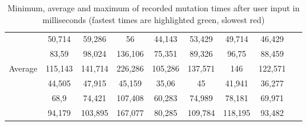 \documentclass[a4paper, 10pt]{article}
\begin{document}
\begin{table}[!ht]
\begin{adjustbox}{angle=90}
{\begin{tabular}{|l|c|c|c|c|c|c|c|r|}
                 \hline
                                                     & 50,714  & 59,286                    & 56                        & 44,143                  & 53,429  & 49,714  & 46,429  & ~       \\
                                                     & 83,59   & 98,024                    & 136,106                   & 75,351                  & 89,326  & 96,75   & 88,459  & ~       \\
                 \multirow{-3}{*}{Average}           & 115,143 & 141,714                   & 226,286                   & 105,286                 & 137,571 & 146     & 122,571 & ~       \\ \hline
\rowcolor{white}                                     & 44,505  & 47,915                    & 45,159                    & 35,06                   & 45      & 41,941  & 36,277  & ~       \\
\rowcolor{white}                                     & 68,9    & 74,421                    & 107,408                   & 60,283                  & 74,989  & 78,181  & 69,971  & ~       \\
\rowcolor{white} \multirow{-3}{*}{Weighted average}  & 94,179  & 103,895                   & 167,077                   & 80,285                  & 109,784 & 118,195 & 93,482  & ~       \\ \hline
      \end{tabular}
    }
  \end{adjustbox}
  \caption{Minimum, average and maximum of recorded mutation times after user input in milliseconds (fastest times are highlighted green, slowest red)}
  \label{tab:mutations:times}
\end{table}
\end{document}
